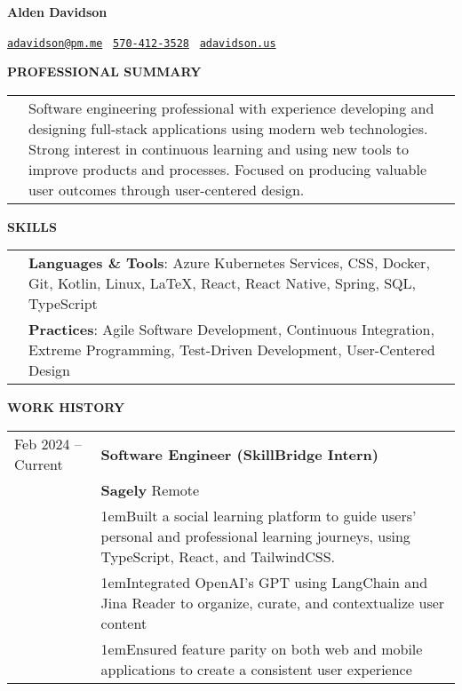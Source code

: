 \documentclass[11pt]{article}
\newlength{\dateColumnWidth}
\newcommand{\customBulletLabel}{\raisebox{0.4ex}{\tiny$\bullet$}}
\newcommand{\detail}{\par\noindent\makebox[1em][l]{\customBulletLabel}\hangindent1em}
\newcommand{\sectionHeader}[1]{{\Large \textbf{#1}}\xhrulefill{black!60}{3pt}\bigbreak}
\begin{document}
\begin{center}
    \begin{minipage}{0.70\textwidth}
        {\Huge\textbf{Alden Davidson}}
    \end{minipage}%
    \begin{minipage}{0.30\textwidth}
        \raggedleft
        \href{mailto:adavidson@pm.me}{\nolinkurl{adavidson@pm.me}}~
        \href{tel:5704123528}{\nolinkurl{570-412-3528}}~
        \href{https://adavidson.us}{\nolinkurl{adavidson.us}}~
    \end{minipage}
\end{center}
\sectionHeader{PROFESSIONAL SUMMARY}
\begin{tabularx}{\textwidth}{@{}p{\dateColumnWidth}X@{}}
     & Software engineering professional with experience developing and designing full-stack applications using modern web technologies.
    Strong interest in continuous learning and using new tools to improve products and processes.
    Focused on producing valuable user outcomes through user-centered design.
\end{tabularx}
\bigbreak
\sectionHeader{SKILLS}
\begin{tabularx}{\textwidth}{@{}p{\dateColumnWidth}X@{}}
     & \textbf{Languages \& Tools}: Azure Kubernetes Services, CSS, Docker, Git, Kotlin, Linux, \LaTeX, React, React Native, Spring, SQL, TypeScript \\
     & \textbf{Practices}: Agile Software Development, Continuous Integration, Extreme Programming, Test-Driven Development, User-Centered Design    \\
\end{tabularx}
\bigbreak
\sectionHeader{WORK HISTORY}
\begin{tabularx}{\textwidth}{@{}p{\dateColumnWidth}X@{}}
    Feb 2024 -- Current & \textbf{Software Engineer (SkillBridge Intern)}                                                                                                 \\
                        & \textbf{Sagely} \textbar{} Remote                                                                                                               \\
                        & \detail Built a social learning platform to guide users' personal and professional learning journeys, using TypeScript, React, and TailwindCSS. \\
                        & \detail Integrated OpenAI's GPT using LangChain and Jina Reader to organize, curate, and contextualize user content                             \\
                        & \detail Ensured feature parity on both web and mobile applications to create a consistent user experience                                       \\
\end{tabularx}
\end{document}
